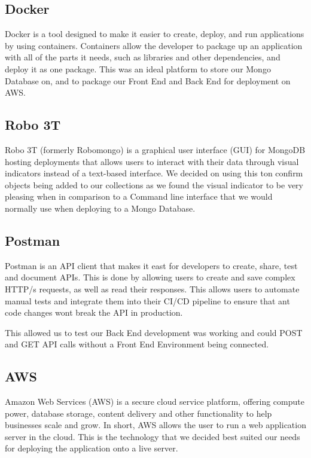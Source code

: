 \subsection{Docker}
Docker is a tool designed to make it easier to create, deploy, and run applications by using containers. Containers allow the developer to package up an application with all of the parts it needs, such as libraries and other dependencies, and deploy it as one package. This was an ideal platform to store our Mongo Database on, and to package our Front End and Back End for deployment on AWS.

\subsection{Robo 3T}
Robo 3T (formerly Robomongo) is a graphical user interface (GUI) for MongoDB hosting deployments that allows users to interact with their data through visual indicators instead of a text-based interface. We decided on using this ton confirm objects being added to our collections as we found the visual indicator to be very pleasing when in comparison to a Command line interface that we would normally use when deploying to a Mongo Database.

\subsection{Postman}
Postman is an API client that makes it east for developers to create, share, test and document APIs. This is done by allowing users to create and save complex HTTP/s requests, as well as read their responses. This allows users to automate manual tests and integrate them into their CI/CD pipeline to ensure that ant code changes wont break the API in production. \par
This allowed us to test our Back End development was working and could POST and GET API calls without a Front End Environment being connected.

\subsection{AWS}
Amazon Web Services (AWS) is a secure cloud service platform, offering compute power, database storage, content delivery and other functionality to help businesses scale and grow. In short, AWS allows the user to run a web application server in the cloud. This is the technology that we decided best suited our needs for deploying the application onto a live server.

